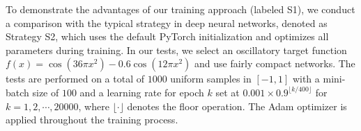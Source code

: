 \documentclass[review,hidelinks,onefignum,onetabnum]{siamart250211}
\begin{document}

To demonstrate the advantages of our training approach (labeled S1), we conduct a comparison with the typical strategy in deep neural networks, denoted as Strategy S2, which uses the default PyTorch initialization and optimizes all parameters during training. In our tests, we select an oscillatory target function $f(x)=\cos(36\pi x^2)-0.6\cos(12\pi x^2)$ and use fairly compact networks. The tests are performed on a total of $1000$ uniform samples in $[-1,1]$ with a mini-batch size of $100$ and a learning rate for epoch $k$ set at $0.001 \times 0.9^{\lfloor k/400 \rfloor}$ for $k = 1, 2, \cdots, 20000$, where $\lfloor \cdot \rfloor$ denotes the floor operation. The Adam optimizer \cite{DBLP:journals/corr/KingmaB14} is applied throughout the training process.
\end{document}

